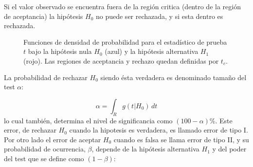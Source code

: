 Si el valor observado se encuentra fuera de la región critica (dentro de la
región de aceptancia) la hipótesis $H_0$ no puede ser rechazada, y si esta
dentro es rechazada.

\begin{figure}[h]
  \centering
  
  \caption{Funciones de densidad de probabilidad para el estadístico de prueba
    $t$ bajo la hipótesis nula $H_0$ (azul) y la hipótesis alternativa $H_1$
    (rojo). Las regiones de aceptancia y rechazo quedan definidas por $t_c$.}
  \label{fig:stat_test}
\end{figure}





La probabilidad de rechazar $H_0$ siendo ésta verdadera es denominado tamaño del test $\alpha$:

\begin{equation}
  \alpha = \int_{R} g(t|H_0)\, dt
\end{equation}
%
lo cual también, determina el nivel de significancia como
$(100 - \alpha) \%$. Este error, de rechazar $H_0$ cuando la hipotesis es verdadera, es llamado
error de tipo I. Por otro lado el error de aceptar $H_0$ cuando es falsa se
llama error de tipo II, y su probabilidad de ocurrencia, $\beta$, depende de la
hipótesis alternativa $H_1$ y del poder del test que se define como $(1-\beta)$:

